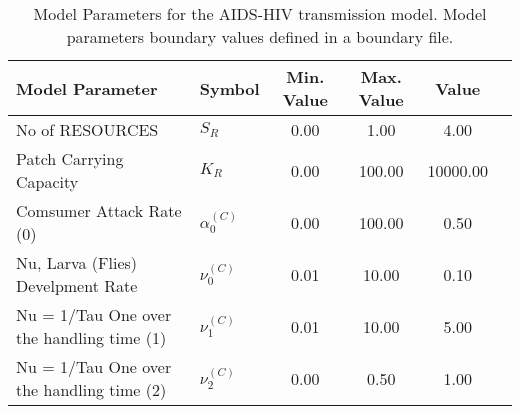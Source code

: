 \begin{table}
\centering
\begin{tabular}{p{5cm}lcccc}
{\bf Model Parameter} & {\bf Symbol} & {\bf Min. Value} & {\bf Max. Value} & {\bf Value}\\
\hline\hline
No of RESOURCES & $S_R$ & 0.00 & 1.00 & 4.00\\
Patch Carrying Capacity & $K_R$ & 0.00 & 100.00 & 10000.00\\
Comsumer Attack Rate (0) & $\alpha^{(C)}_0$ & 0.00 & 100.00 & 0.50\\
Nu, Larva (Flies) Develpment Rate & $\nu^{(C)}_0$ & 0.01 & 10.00 & 0.10\\
 Nu = 1/Tau	 One over the handling time (1) & $\nu^{(C)}_1$ & 0.01 & 10.00 & 5.00\\
 Nu = 1/Tau	 One over the handling time (2) & $\nu^{(C)}_2$ & 0.00 & 0.50 & 1.00\\
\hline\hline
\end{tabular}
\caption{Model Parameters for the AIDS-HIV transmission model. Model parameters boundary values defined in a boundary file.}
\end{table}
